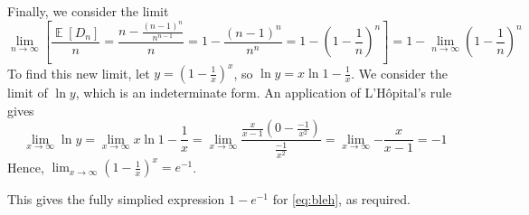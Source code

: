 \documentclass[11pt,letterpaper]{article}
\newcommand{\parens}[1]{\left(#1\right)}
\DeclareMathOperator{\Expect}{\mathbb{E}}
\newcommand{\E}[1]{\Expect{\left[#1\right]}}
\begin{document}
\begin{enumerate}
        Finally, we consider the limit
        \begin{equation}
            \label{eq:bleh}
            \lim_{n\to\infty} \left[
                {\frac{\E{D_n}}{n}}
                = {\frac{n - \frac{(n-1)^n}{n^{n-1}}}{n}}
                = 1 - \frac{(n-1)^n}{n^n}
                = 1 - \parens{1 - \frac{1}{n}}^n
            \right]
            = 1 - \lim_{n\to\infty} \parens{1 - \frac{1}{n}}^n
        \end{equation}
        To find this new limit, let $y = \parens{1 - \frac{1}{x}}^x$, so
        $\ln y = x \ln {1 - \frac{1}{x}}$. We consider the limit of $\ln y$,
        which is an indeterminate form. An application of L'H\^opital's rule
        gives
        \begin{equation*}
            \lim_{x\to\infty} {\ln y}
            = \lim_{x\to\infty} {x \ln {1 - \frac{1}{x}}}
            = \lim_{x\to\infty} {
                \frac{\frac{x}{x-1} \parens{0 - \frac{-1}{x^2}}}{
                    \frac{-1}{x^2}
                }
            }
            = \lim_{x\to\infty} {- \frac{x}{x-1}} = -1
        \end{equation*}
        Hence, $\lim_{x\to\infty} \parens{1 - \frac{1}{x}}^x = e^{-1}$.

        This gives the fully simplied expression $1 - e^{-1}$ for
        \eqref{eq:bleh}, as required.
\end{enumerate}
\end{document}
